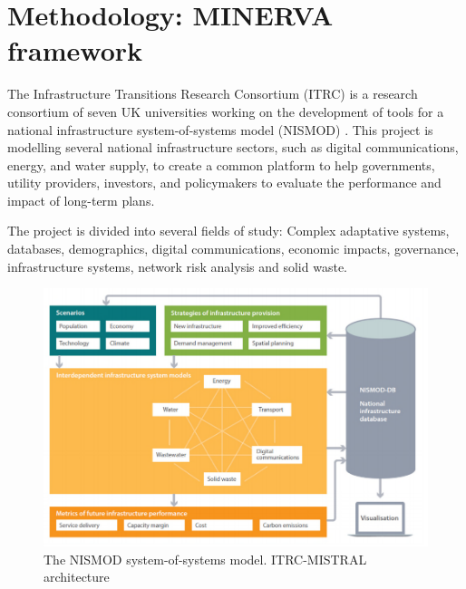 
\vspace{\baselineskip}\chapter{Methodology: MINERVA framework}
The Infrastructure Transitions Research Consortium (ITRC) \cite{3-01} is a research consortium of seven UK universities working on the development of tools for a national infrastructure system-of-systems model (NISMOD) \cite{3-02}. This project is modelling several national infrastructure sectors, such as digital communications, energy, and water supply, to create a common platform to help governments, utility providers, investors, and policymakers to evaluate the performance and impact of long-term plans.\par
The project is divided into several fields of study: Complex adaptative systems, databases, demographics, digital communications, economic impacts, governance, infrastructure systems, network risk analysis and solid waste.




\begin{figure}[H]
	\begin{Center}
		\includegraphics[width=1\textwidth]{./media/image14.png}
		\caption{The NISMOD system-of-systems model. ITRC-MISTRAL architecture\cite{3-12}}
	\end{Center}
\end{figure}



